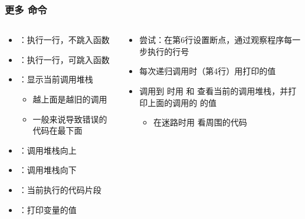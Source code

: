 \begin{CJK}{UTF8}{gbsn}
\begin{frame} [fragile]
	\frametitle{更多  命令}
	\linespread{1.25}
	\begin{columns}[T]
		\begin{column}[T]{.5\textwidth}
			\begin{itemize}
			\item {}：执行一行，不跳入函数
			\item {}：执行一行，可跳入函数
			\item {}：显示当前调用堆栈
				\begin{itemize}
				\item 越上面是越旧的调用
				\item 一般来说导致错误的代码在最下面
				\end{itemize}
			\item {}：调用堆栈向上
			\item {}：调用堆栈向下
			\item {}：当前执行的代码片段
			\item {}：打印变量的值
			\end{itemize}
		\end{column}
		\begin{column}[T]{.5\textwidth}
			\begin{itemize}
			\item 尝试：在第6行设置断点，通过观察程序每一步执行的行号
			\item 每次递归调用时（第4行）用打印的值
			\item 调用到  时用  和
					 查看当前的调用堆栈，并打印上面的调用的
					 的值
				\begin{itemize}
				\item 在迷路时用  看周围的代码
				\end{itemize}
			\end{itemize}
		\end{column}
	\end{columns}
	\begin{comment}
	b 6
	r	# line 6
	s	# line 1
	s	# line 2
	p x	# 			4
	s	# line 4
	s	# line 1
	s	# line 2
	p x	# 			2
	s	# line 4
	s	# line 1
	s	# line 2
	p x	# 			0
	bt
	up	# line 4, stack -2
	p x	# 			2
	up	# line 4, stack -3
	p x	# 			6
	up	# line 6, stack -4
	l	# line 6
	\end{comment}
\end{frame}


\end{CJK}
